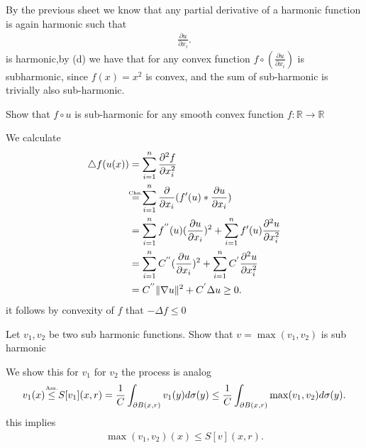 \begin{solution}
  By the previous sheet we know that any partial derivative of a harmonic function is again harmonic such that 
  \begin{align*}
    \frac{\partial u}{\partial x_i}
  .\end{align*}
  is harmonic,by (d) we have that for any convex function $f \circ (\frac{\partial u}{\partial x_i})$   is subharmonic,
  since $f(x) = x^2$ is convex, and the sum of sub-harmonic is trivially also sub-harmonic.
\end{solution}
\begin{question}[d]
 Show that $f \circ u$  is sub-harmonic for any smooth convex function $f : \mathbb{R} \to \mathbb{R} $
\end{question}
\begin{solution}
 We calculate 
 \begin{align*}
   \triangle f(u(x)) &= \sum_{i=1}^{n} \frac{\partial ^2 f}{\partial x_i^2}  \\
                     &\myS{Chn.}{=} \sum_{i=1}^{n} \frac{\partial}{\partial x_i}(f'(u)*\frac{\partial u}{\partial x_i})\\
                     &= \sum_{i=1}^{n} f^{''}(u) (\frac{\partial u}{\partial x_i})^2 + \sum_{i=1}^{n} f'(u)  \frac{\partial ^2 u}{\partial x_i^2}\\
                     &= \sum_{i=1}^{n} C^{''}  (\frac{\partial u}{\partial x_i})^2 + \sum_{i=1}^{n} C^{'}  \frac{\partial ^2 u}{\partial x_i^2}  \\
                     &= C^{''} \|\nabla u\|^2 + C^{'} \Delta u \ge 0  
 .\end{align*}
it follows by convexity of $f$ that  $- \Delta f \le 0$  
\end{solution}
\begin{question}[e]
 Let $v_{1},v_{2}$  be two sub harmonic functions. Show that $v = \max(v_{1},v_{2})$ is sub harmonic 
\end{question}
\begin{solution}
 We show this for $v_{1}$  for $v_{2}$  the process is analog 
 \begin{align*}
   v_{1}(x) \myS{Ass.}{\le } S[v_{1}](x,r) = \frac{1}{C} \int_{\partial B(x,r)} v_{1}(y) d\sigma(y) \le  \frac{1}{C} \int_{\partial B(x,r)}\max(v_{1},v_{2}) d\sigma(y) 
 .\end{align*}
 this implies 
 \begin{align*}
   \max(v_{1},v_{2})(x) \le  S[v](x,r)
 .\end{align*}
\end{solution}
